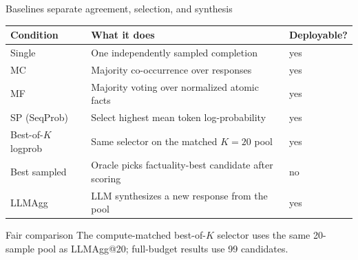 \documentclass[aspectratio=169,10pt]{beamer}
\newcommand{\LLMAgg}{\textsf{LLMAgg}}
\begin{document}
\begin{frame}{Baselines separate agreement, selection, and synthesis}
  \begin{center}
  \color{ink}
  \begin{tabularx}{0.94\textwidth}{@{}l X l@{}}
    \toprule
    \textbf{Condition} & \textbf{What it does} & \textbf{Deployable?}\\
    \midrule
    Single & One independently sampled completion & yes\\
    MC & Majority co-occurrence over responses & yes\\
    MF & Majority voting over normalized atomic facts & yes\\
    SP (SeqProb) & Select highest mean token log-probability & yes\\
    Best-of-$K$ logprob & Same selector on the matched $K=20$ pool & yes\\
    Best sampled & Oracle picks factuality-best candidate after scoring & no\\
    \LLMAgg{} & LLM synthesizes a new response from the pool & yes\\
    \bottomrule
  \end{tabularx}
  \end{center}
  \vspace{8pt}
  \begin{block}{Fair comparison}
    \small The compute-matched best-of-$K$ selector uses the same 20-sample pool as \LLMAgg{}@20; full-budget results use 99 candidates.
  \end{block}
\end{frame}
\end{document}
